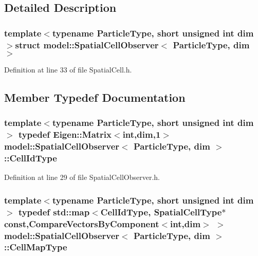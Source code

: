 \subsection{Detailed Description}
\subsubsection*{template$<$typename Particle\+Type, short unsigned int dim$>$struct model\+::\+Spatial\+Cell\+Observer$<$ Particle\+Type, dim $>$}



Definition at line 33 of file Spatial\+Cell.\+h.



\subsection{Member Typedef Documentation}
\hypertarget{structmodel_1_1_spatial_cell_observer_a4463a457f13bd480c87facc50799832b}{}
\subsubsection[{Cell\+Id\+Type}]{\setlength{\rightskip}{0pt plus 5cm}template$<$typename Particle\+Type, short unsigned int dim$>$ typedef Eigen\+::\+Matrix$<$int,{\bf dim},1$>$ {\bf model\+::\+Spatial\+Cell\+Observer}$<$ Particle\+Type, {\bf dim} $>$\+::{\bf Cell\+Id\+Type}}\label{structmodel_1_1_spatial_cell_observer_a4463a457f13bd480c87facc50799832b}


Definition at line 29 of file Spatial\+Cell\+Observer.\+h.

\hypertarget{structmodel_1_1_spatial_cell_observer_a3ee3ac7a68725cbe49ef4ae951ce2231}{}
\subsubsection[{Cell\+Map\+Type}]{\setlength{\rightskip}{0pt plus 5cm}template$<$typename Particle\+Type, short unsigned int dim$>$ typedef std\+::map$<${\bf Cell\+Id\+Type}, {\bf Spatial\+Cell\+Type}$\ast$ const,{\bf Compare\+Vectors\+By\+Component}$<$int,{\bf dim}$>$ $>$ {\bf model\+::\+Spatial\+Cell\+Observer}$<$ Particle\+Type, {\bf dim} $>$\+::{\bf Cell\+Map\+Type}}\label{structmodel_1_1_spatial_cell_observer_a3ee3ac7a68725cbe49ef4ae951ce2231}


